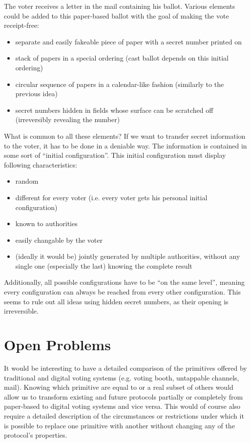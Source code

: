 \documentclass{article}
\begin{document}
The voter receives a letter in the mail containing his ballot. Various elements could be added to this paper-based ballot with the goal of making the vote receipt-free:
\begin{itemize}
  \item separate and easily fakeable piece of paper with a secret number printed on
  \item stack of papers in a special ordering (cast ballot depends on this initial ordering)
  \item circular sequence of papers in a calendar-like fashion (similarly to the previous idea)
  \item secret numbers hidden in fields whose surface can be scratched off (irreversibly revealing the number)
\end{itemize}

What is common to all these elements? If we want to transfer secret information to the voter, it has to be done in a deniable way. The information is contained in some sort of ``initial configuration''. This initial configuration must display following characteristics:
\begin{itemize}
  \item random
  \item different for every voter (i.e. every voter gets his personal initial configuration)
  \item known to authorities
  \item easily changable by the voter
  \item (ideally it would be) jointly generated by multiple authorities, without any single one (especially the last) knowing the complete result
\end{itemize}

Additionally, all possible configurations have to be ``on the same level'', meaning every configuration can always be reached from every other configuration. This seems to rule out all ideas using hidden secret numbers, as their opening is irreversible.



\section{Open Problems}
It would be interesting to have a detailed comparison of the primitives offered by traditional and digital voting systems (e.g. voting booth, untappable channels, mail). Knowing which primitive are equal to or a real subset of others would allow us to transform existing and future protocols partially or completely from paper-based to digital voting systems and vice versa. This would of course also require a detailed description of the circumstances or restrictions under which it is possible to replace one primitive with another without changing any of the protocol's properties.
\end{document}
